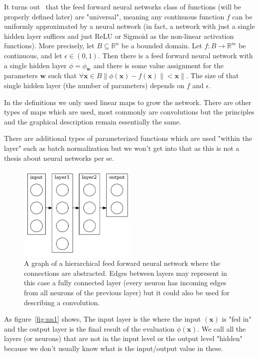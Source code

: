 \documentclass[11pt, a4paper]{report}
\theoremstyle{plain}
\theoremstyle{definition}
\theoremstyle{remark}
\newcommand{\R}{\mathbb{R}}
\newcommand{\x}{\mathbf{x}}
\newcommand{\w}{\mathbf{w}}
\newcommand{\lt}{<}
\begin{document}
It turns out~\cite{nielsen2015neural} that the feed forward neural networks
class of functions (will be properly defined later)
are "universal", meaning any continuous function $f$ can be
uniformly approximated by a neural network (in fact, a network with just a
single hidden layer suffices and just ReLU or Sigmoid as the non-linear
activation functions).
More precisely, let $B \subseteq \R^n$ be a bounded domain. Let $f : B \to \R^m$
be continuous, and let $\epsilon \in (0,1)$. Then there is a feed forward neural
network with a single hidden layer $\phi = \phi_{\w}$ and there is some value assignment
for the parameters $\w$ such that 
$\forall \x \in B \|\phi(\x) - f(\x)\| \lt \x \|$. The size of that single
hidden layer (the number of parameters) depends on $f$ and $\epsilon$.

In the definitions we only used linear maps to grow the network. 
There are other types of maps which are used, most commonly are convolutions 
but the principles and the graphical description remain essentially the same.

There are additional types of parameterized functions which are used "within the
layer" such as batch normalization but we won't get into that as this is not a
thesis about neural networks per se.

\begin{figure}[!h]
\begin{framed}
\centering
\includegraphics[width=0.5\textwidth]{./images/models/multilayer.gv.png}
\caption{
A graph of a hierarchical feed forward neural network where the connections 
are abstracted. Edges between layers may represent in this case a fully
connected layer (every neuron has incoming edges from all neurons of the
previous layer) but it could also be used for describing a convolution.
}
\label{fig:nn2}
\end{framed}
\end{figure}

As figure~\ref{fig:nn1} shows, 
The input layer is the where the input $(\x)$ is "fed in" and the output layer
is the final result of the evaluation $\phi(\x)$.
We call all the layers (or neurons) that are 
not in the input level or the output level "hidden"
because we don't usually know what is the input/output value in these.
\end{document}
